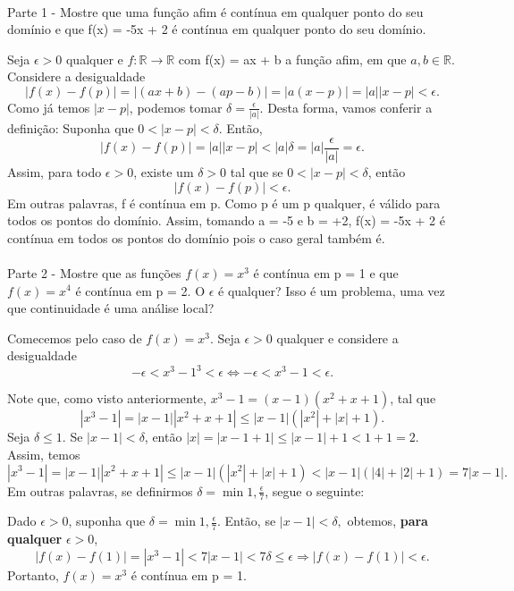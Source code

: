 \paragraph{} Parte 1 - Mostre que uma fun\c c\~ao afim \'e cont\'inua em qualquer ponto do seu dom\'inio e que f(x) = -5x + 2 \'e cont\'inua em qualquer ponto do seu dom\'inio.
\begin{proof*}
Seja $\epsilon > 0$ qualquer e $f:\mathbb{R}\rightarrow\mathbb{R}$ com f(x) = ax + b a fun\c c\~ao afim, em que $a, b\in\mathbb{R}$. Considere a desigualdade 
$$
|f(x) - f(p)| = |(ax + b) - (ap - b)| = |a(x - p)| = |a||x - p|< \epsilon.
$$
Como j\'a temos $|x - p|$, podemos tomar $\delta = \frac{\epsilon}{|a|}.$ Desta forma, vamos conferir a defini\c c\~ao: Suponha que $0 < |x - p| < \delta.$ Ent\~ao, 
$$
|f(x) - f(p)| = |a||x - p| < |a|\delta = |a|\frac{\epsilon}{|a|} = \epsilon.
$$
Assim, para todo $\epsilon > 0$, existe um $\delta > 0$ tal que se $0 < |x - p| < \delta$, ent\~ao
$$
|f(x) - f(p)| < \epsilon.
$$
Em outras palavras, f \'e cont\'inua em p. Como p \'e um p qualquer, \'e v\'alido para todos os pontos do dom\'inio. Assim, tomando a = -5 e b = +2, f(x) = -5x + 2 \'e cont\'inua em todos os pontos do dom\'inio pois o caso geral tamb\'em \'e.

\qedsymbol
\end{proof*}

\paragraph{} Parte 2 - Mostre que as fun\c c\~oes $f(x) = x^3$ \'e cont\'inua em p = 1 e que $f(x) = x^4$ \'e cont\'inua em p = 2. O $\epsilon$ \'e qualquer? Isso \'e um problema, uma vez que continuidade \'e uma an\'alise local?
\begin{sol*}
Comecemos pelo caso de $f(x) = x^3$. Seja $\epsilon > 0$ qualquer e considere a desigualdade
$$
-\epsilon < x^3 - 1^3 < \epsilon \Leftrightarrow -\epsilon < x^3 - 1 < \epsilon.
$$

Note que, como visto anteriormente, $x^3 - 1 = (x - 1)(x^2 + x + 1)$, tal que
$$
|x^3 - 1| = |x - 1||x^2 + x + 1| \leq |x - 1|(|x^2| + |x| + 1).
$$
Seja $\delta \leq 1$. Se $|x - 1| < \delta$, ent\~ao $|x| = |x - 1 + 1| \leq |x - 1| + 1 < 1 + 1 = 2.$ Assim, temos
$$
|x^3 - 1| = |x - 1||x^2 + x + 1| \leq |x - 1|(|x^2| + |x| + 1) < |x-1|(|4| + |2| + 1) = 7|x - 1|.
$$
Em outras palavras, se definirmos $\delta = \min{1,\frac{\epsilon}{7}}$, segue o seguinte:

Dado $\epsilon > 0$, suponha que $\delta = \min{1, \frac{\epsilon}{7}}$. Ent\~ao, se $|x - 1| < \delta,$ obtemos, \textbf{para qualquer} $\epsilon > 0$,
$$
|f(x) - f(1)| = |x^3 - 1| < 7|x - 1| < 7\delta \leq \epsilon \Rightarrow |f(x) - f(1)| < \epsilon.
$$
Portanto, $f(x) = x^3$ \'e cont\'inua em p = 1.

\end{sol*}

